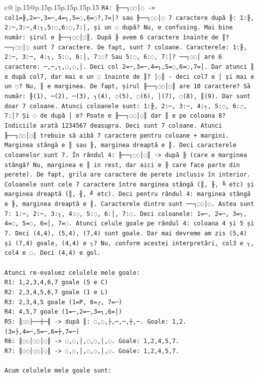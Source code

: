 \documentclass{article}
\begin{document}
{\begin{supertabular}{c@{$\;$}|p{.15\linewidth}@{}p{.15\linewidth}p{.15\linewidth}p{.15\linewidth}p{.15\linewidth}p{.15\linewidth}}
{{{\texttt{R4: ╟──┐◌◌│◌ {-}> col1=╟,2=─,3=─,4=┐,5=◌,6=◌?,7=│? sau ╟──┐◌◌│◌ 7 caractere după ╟: 1:╟, 2:─,3:─,4:┐,5:◌,6:◌,7:│, și un ◌ după? Nu, e confusing. Mai bine număr: șirul e ╟──┐◌◌│◌║. După ╟ avem 6 caractere înainte de ║? ──┐◌◌│◌ sunt 7 caractere. De fapt, sunt 7 coloane. Caracterele: 1:╟, 2:─, 3:─, 4:┐, 5:◌, 6:│, 7:◌? Sau 5:◌, 6:◌, 7:│? ──┐◌◌│ are 6 caractere: ─,─,┐,◌,◌,│. Deci col 2=─,3=─,4=┐,5=◌,6=◌,7=│. Dar atunci ║ e după col7, dar mai e un ◌ înainte de ║? │◌║ {-} deci col7 e │ și mai e un ◌? Nu, ║ e marginea. De fapt, șirul ╟──┐◌◌│◌║ are 10 caractere? Să număr: ╟(1), ─(2), ─(3), ┐(4), ◌(5), ◌(6), │(7), ◌(8), ║(9). Dar sunt doar 7 coloane. Atunci coloanele sunt: 1:╟, 2:─, 3:─, 4:┐, 5:◌, 6:◌, 7:│? Și ◌ de după │ e? Poate e ╟──┐◌◌│◌║ dar ║ e pe coloana 8? Indiciile arată  1234567 deasupra. Deci sunt 7 coloane. Atunci ╟──┐◌◌│◌║ trebuie să aibă 7 caractere pentru coloane + margini. Marginea stângă e ║ sau ╟, marginea dreaptă e ║. Deci caracterele coloanelor sunt 7. În rândul 4: ╟──┐◌◌│◌║ {-}> după ╟ (care e marginea stângă? Nu, marginea e ║ in rest, dar aici e ╟ care face parte din perete). De fapt, grila are caractere de perete inclusiv în interior. Coloanele sunt cele 7 caractere între marginea stângă (║, ╟, ╚ etc) și marginea dreaptă (║, ╢, ╝ etc). Deci pentru rândul 4: marginea stângă e ╟, marginea dreaptă e ║. Caracterele dintre sunt ──┐◌◌│◌. Astea sunt 7: 1:─, 2:─, 3:┐, 4:◌, 5:◌, 6:│, 7:◌. Deci coloanele: 1=─, 2=─, 3=┐, 4=◌, 5=◌, 6=│, 7=◌. Atunci celule goale pe rândul 4: coloana 4 și 5 și 7. Deci (4,4), (5,4), (7,4) sunt goale. Dar mai devreme am zis (5,4) și (7,4) goale, (4,4) e ┐? Nu, conform acestei interpretări, col3 e ┐, col4 e ◌. Deci (4,4) e gol.} \\
\\ 
\texttt{Atunci re{-}evaluez celulele mele goale:} \\
\texttt{R1: 1,2,3,4,6,7 goale (5 e C)} \\
\texttt{R2: 2,3,4,5,6,7 goale (1 e L)} \\
\texttt{R3: 2,3,4,5 goale (1=P, 6=┌, 7=─)} \\
\texttt{R4: 4,5,7 goale (1=─,2=─,3=┐,6=│)} \\
\texttt{R5: ║◌◌├──┼─╢ {-}> după ║: ◌,◌,├,─,─,┼,─. Goale: 1,2. (3=├,4=─,5=─,6=┼,7=─)} \\
\texttt{R6: ║◌◌│◌◌│◌║ {-}> ◌,◌,│,◌,◌,│,◌. Goale: 1,2,4,5,7.} \\
\texttt{R7: ║◌◌│◌◌│◌║ {-}> ◌,◌,│,◌,◌,│,◌. Goale: 1,2,4,5,7.} \\
\\ 
\texttt{Acum celulele mele goale sunt:} \\
}}}
\end{supertabular}}
\end{document}
